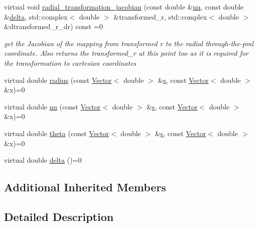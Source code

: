 \begin{DoxyCompactItemize}
\item 
virtual void \hyperlink{classoomph_1_1AnnularPMLElementBase_a609c9b6bb60d9bc0de871e9731654805}{radial\+\_\+transformation\+\_\+jacobian} (const double \&\hyperlink{classoomph_1_1AnnularPMLElementBase_ac6671111f31c3a5012d0df53a1c24b76}{nu}, const double \&\hyperlink{classoomph_1_1AnnularPMLElementBase_ad76f02aa6eb19a5757e7d4cc26ec45fa}{delta}, std\+::complex$<$ double $>$ \&transformed\+\_\+r, std\+::complex$<$ double $>$ \&dtransformed\+\_\+r\+\_\+dr) const =0
\begin{DoxyCompactList}\small\item\em get the Jacobian of the mapping from transformed r to the radial through-\/the-\/pml coordinate. Also returns the transformed\+\_\+r at this point too as it is required for the transformation to cartesian coordinates \end{DoxyCompactList}\item 
virtual double \hyperlink{classoomph_1_1AnnularPMLElementBase_a5d3de2d99d848942e6fb533fd9cf58da}{radius} (const \hyperlink{classoomph_1_1Vector}{Vector}$<$ double $>$ \&\hyperlink{cfortran_8h_ab7123126e4885ef647dd9c6e3807a21c}{s}, const \hyperlink{classoomph_1_1Vector}{Vector}$<$ double $>$ \&x)=0
\item 
virtual double \hyperlink{classoomph_1_1AnnularPMLElementBase_ac6671111f31c3a5012d0df53a1c24b76}{nu} (const \hyperlink{classoomph_1_1Vector}{Vector}$<$ double $>$ \&\hyperlink{cfortran_8h_ab7123126e4885ef647dd9c6e3807a21c}{s}, const \hyperlink{classoomph_1_1Vector}{Vector}$<$ double $>$ \&x)=0
\item 
virtual double \hyperlink{classoomph_1_1AnnularPMLElementBase_a74036190f87f79129cdcda562664dd18}{theta} (const \hyperlink{classoomph_1_1Vector}{Vector}$<$ double $>$ \&\hyperlink{cfortran_8h_ab7123126e4885ef647dd9c6e3807a21c}{s}, const \hyperlink{classoomph_1_1Vector}{Vector}$<$ double $>$ \&x)=0
\item 
virtual double \hyperlink{classoomph_1_1AnnularPMLElementBase_ad76f02aa6eb19a5757e7d4cc26ec45fa}{delta} ()=0
\end{DoxyCompactItemize}
\subsection*{Additional Inherited Members}


\subsection{Detailed Description}


